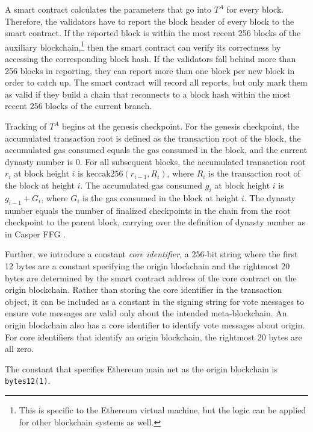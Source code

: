 \documentclass[12pt,a4paper]{article}
\begin{document}
A smart contract calculates the parameters that go into $T^A$ for every block.
Therefore, the validators have to report the block header of every block to the smart contract.
If the reported block is within the most recent 256 blocks of the auxiliary blockchain,\footnote{
	This is specific to the Ethereum virtual machine, but the logic can be applied for other blockchain systems as well.
}
then the smart contract can verify its correctness by accessing the corresponding block hash.
If the validators fall behind more than 256 blocks in reporting, they can report more than one block per new block in order to catch up.
The smart contract will record all reports, but only mark them as valid if they build a chain that reconnects to a block hash within the most recent 256 blocks of the current branch.

Tracking of $T^A$ begins at the genesis checkpoint.
For the genesis checkpoint, the accumulated transaction root is defined as the transaction root of the block, the accumulated gas consumed equals the gas consumed in the block, and the current dynasty number is 0.
For all subsequent blocks, the accumulated transaction root $r_i$ at block height $i$ is $\text{keccak256}(r_{i-1}, R_i)$, where $R_i$ is the transaction root of the block at height $i$.
The accumulated gas consumed $g_i$ at block height $i$ is $g_{i-1} + G_i$, where $G_i$ is the gas consumed in the block at height $i$.
The dynasty number equals the number of finalized checkpoints in the chain from the root checkpoint to the parent block, carrying over the definition of dynasty number as in Casper FFG \cite{casperffg}.

Further, we introduce a constant \emph{core identifier}, a 256-bit string where the first 12 bytes are a constant specifying the origin blockchain and the rightmost 20 bytes are determined by the smart contract address of the core contract on the origin blockchain.
Rather than storing the core identifier in the transaction object, it can be included as a constant in the signing string for vote messages to ensure vote messages are valid only about the intended meta-blockchain.
An origin blockchain also has a core identifier to identify vote messages about origin.
For core identifiers that identify an origin blockchain, the rightmost 20 bytes are all zero.

The constant that specifies Ethereum main net as the origin blockchain is \texttt{bytes12(1)}.

\end{document}
